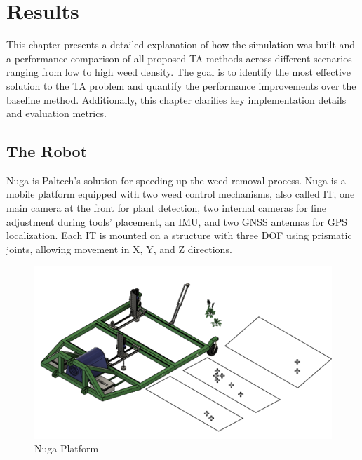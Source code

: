 \chapter{Results}\label{ch:Results}
This chapter presents a detailed explanation of how the simulation was built and a performance comparison of all proposed \ac{TA} methods across different scenarios ranging from low to high weed density. The goal is to identify the most effective solution to the \ac{TA} problem and quantify the performance improvements over the baseline method. Additionally, this chapter clarifies key implementation details and evaluation metrics.

\section{The Robot}\label{sec:nuga}
Nuga is Paltech's solution for speeding up the weed removal process. Nuga is a mobile platform equipped with two weed control mechanisms, also called \ac{IT}, one main camera at the front for plant detection, two internal cameras for fine adjustment during tools' placement, an IMU, and two GNSS antennas for GPS localization. Each \ac{IT} is mounted on a structure with three \ac{DOF} using prismatic joints, allowing movement in X, Y, and Z directions.

\begin{figure}[bth]
    \centering
    \includegraphics[width=0.7\linewidth]{gfx/ch03/nuga_cad.png}
    \caption{Nuga Platform}
    \label{fig:nuga-cad}
\end{figure}





